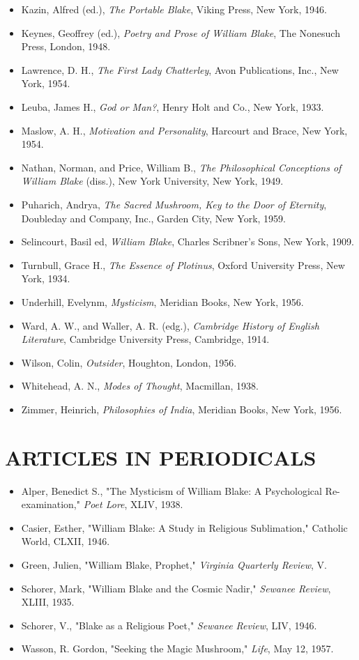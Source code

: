 \begin{itemize}
	\item Kazin, Alfred (ed.), \textit{The Portable Blake}, Viking Press, New York, 1946.
	\item Keynes, Geoffrey (ed.), \textit{Poetry and Prose of William Blake}, The Nonesuch Press, London, 1948.
	\item Lawrence, D. H., \textit{The First Lady Chatterley}, Avon Publications, Inc., New York, 1954.
	\item Leuba, James H., \textit{God or Man?}, Henry Holt and Co., New York, 1933.
	\item Maslow, A. H., \textit{Motivation and Personality}, Harcourt and Brace, New York, 1954.
	\item Nathan, Norman, and Price, William B., \textit{The Philosophical Conceptions of William Blake} (diss.), New York University, New York, 1949.
	\item Puharich, Andrya, \textit{The Sacred Mushroom, Key to the Door of Eternity}, Doubleday and Company, Inc., Garden City, New York, 1959.
	\item Selincourt, Basil ed, \textit{William Blake}, Charles Scribner's Sons, New York, 1909.
	\item Turnbull, Grace H., \textit{The Essence of Plotinus}, Oxford University Press, New York, 1934.
	\item Underhill, Evelynm, \textit{Mysticism}, Meridian Books, New York, 1956.
	\item Ward, A. W., and Waller, A. R. (edg.), \textit{Cambridge History of English Literature}, Cambridge University Press, Cambridge, 1914.
	\item Wilson, Colin, \textit{Outsider}, Houghton, London, 1956.
	\item Whitehead, A. N., \textit{Modes of Thought}, Macmillan, 1938.
	\item Zimmer, Heinrich, \textit{Philosophies of India}, Meridian Books, New York, 1956.
\end{itemize}

\section*{\centering ARTICLES IN PERIODICALS}

\begin{itemize}
	\item Alper, Benedict S., "The Mysticism of William Blake: A Psychological Re-examination," \textit{Poet Lore}, XLIV, 1938.
	\item Casier, Esther, "William Blake: A Study in Religious Sublimation," Catholic World, CLXII, 1946.
	\item Green, Julien, "William Blake, Prophet," \textit{Virginia Quarterly Review}, V.
	\item Schorer, Mark, "William Blake and the Cosmic Nadir," \textit{Sewanee Review}, XLIII, 1935.
	\item Schorer, V., "Blake as a Religious Poet," \textit{Sewanee Review}, LIV, 1946.
	\item Wasson, R. Gordon, "Seeking the Magic Mushroom," \textit{Life}, May 12, 1957.
\end{itemize}

